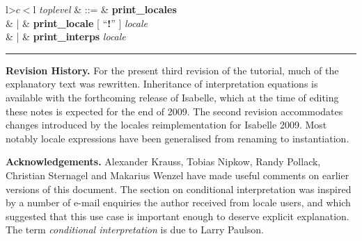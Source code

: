 \begin{isabellebody}
\begin{isamarkuptext}
\begin{table}
\begin{center}
\begin{tabular}{l>$c<$l}
  \textit{toplevel} & ::=
  & \textbf{print\_locales} \\
  & | & \textbf{print\_locale} [ ``\textbf{!}'' ] \textit{locale} \\
  & | & \textbf{print\_interps} \textit{locale}
\end{tabular}
\end{center}
\hrule
\caption{Syntax of Locale Commands.}
\label{tab:commands}
\end{table}%
\end{isamarkuptext}%
\isamarkuptrue%
%
\begin{isamarkuptext}%
\textbf{Revision History.}  For the present third revision of
  the tutorial, much of the explanatory text
  was rewritten.  Inheritance of interpretation equations is
  available with the forthcoming release of Isabelle, which at the
  time of editing these notes is expected for the end of 2009.
  The second revision accommodates changes introduced by the locales
  reimplementation for Isabelle 2009.  Most notably locale expressions
  have been generalised from renaming to instantiation.%
\end{isamarkuptext}%
\isamarkuptrue%
%
\begin{isamarkuptext}%
\textbf{Acknowledgements.}  Alexander Krauss, Tobias Nipkow,
  Randy Pollack, Christian Sternagel and Makarius Wenzel have made
  useful comments on earlier versions of this document.  The section
  on conditional interpretation was inspired by a number of e-mail
  enquiries the author received from locale users, and which suggested
  that this use case is important enough to deserve explicit
  explanation.  The term \emph{conditional interpretation} is due to
  Larry Paulson.%
\end{isamarkuptext}%
\isamarkuptrue%
%
\isadelimtheory
%
\endisadelimtheory
%
\isatagtheory
{}\isamarkupfalse%
%
\endisatagtheory
{\isafoldtheory}%
%
\isadelimtheory
%
\endisadelimtheory
\isanewline
\end{isabellebody}%
